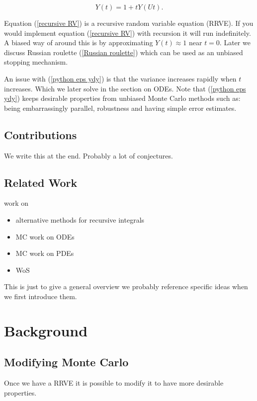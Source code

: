 \documentclass[a4paper,12pt]{article}
\begin{document}
\begin{equation}\label{recursive RV}
    Y(t) = 1 + tY(Ut).
\end{equation}

Equation (\ref{recursive RV}) is a recursive random variable equation (RRVE). If you would implement equation
(\ref{recursive RV}) with recursion it will run indefinitely. A biased way of around this is by approximating
$Y(t) \approx 1$ near $t = 0$. Later we discuss Russian roulette (\ref{Russian roulette}) which
can be used as an unbiased stopping mechanism.

\vspace*{0.2cm}

\begin{pythonn} \label{python eps ydy}
\end{pythonn}

An issue with (\ref{python eps ydy}) is that the variance increases rapidly when $t$ increases. Which we
later solve in the section on ODEs. Note that (\ref{python eps ydy}) keeps desirable properties
from unbiased Monte Carlo methods such as: being embarrassingly parallel,
robustness and having simple error estimates.


\subsection{Contributions}
We write this at the end. Probably a lot of conjectures.

\subsection{Related Work}
work on
\begin{itemize}
    \item alternative methods for recursive integrals
    \item MC work on ODEs
    \item MC work on PDEs
    \item WoS
\end{itemize}
This is just to give a general overview we probably reference specific ideas when we first introduce them.

\section{Background}
\subsection{Modifying Monte Carlo}
Once we have a RRVE it is possible to modify it
to have more desirable properties. \\
\end{document}
